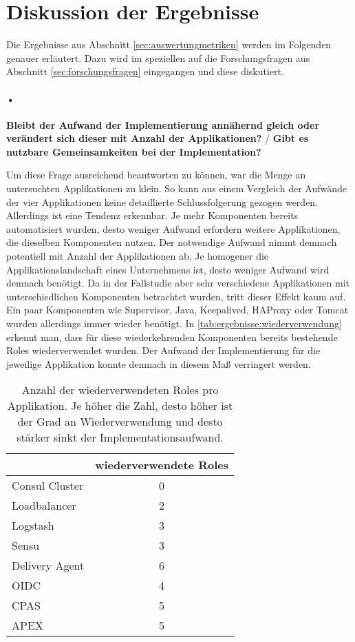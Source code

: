 \section{Diskussion der Ergebnisse}
\label{sec:diskussion}
Die Ergebnisse aus Abschnitt \ref{sec:auswertungmetriken} werden im Folgenden genauer erläutert. Dazu wird im speziellen auf die Forschungsfragen aus Abschnitt \ref{sec:forschungsfragen} eingegangen und diese diskutiert.

\paragraph{•}
\textbf{Bleibt der Aufwand der Implementierung annähernd gleich oder verändert sich dieser mit Anzahl der Applikationen?} / \textbf{Gibt es nutzbare Gemeinsamkeiten bei der Implementation?}

Um diese Frage ausreichend beantworten zu können, war die Menge an untersuchten Applikationen zu klein. So kann aus einem Vergleich der Aufwände der vier Applikationen keine detaillierte Schlussfolgerung gezogen werden. Allerdings ist eine Tendenz erkennbar. Je mehr Komponenten bereits automatisiert wurden, desto weniger Aufwand erfordern weitere Applikationen, die dieselben Komponenten nutzen. Der notwendige Aufwand nimmt demnach potentiell mit Anzahl der Applikationen ab. Je homogener die Applikationslandschaft eines Unternehmens ist, desto weniger Aufwand wird demnach benötigt. Da in der Fallstudie aber sehr verschiedene Applikationen mit unterschiedlichen Komponenten betrachtet wurden, tritt dieser Effekt kaum auf. Ein paar Komponenten wie Supervisor, Java, Keepalived, HAProxy oder Tomcat wurden allerdings immer wieder benötigt. In \autoref{tab:ergebnisse:wiederverwendung} erkennt man, dass für diese wiederkehrenden Komponenten bereits bestehende Roles wiederverwendet wurden. Der Aufwand der Implementierung für die jeweilige Applikation konnte demnach in diesem Maß verringert werden.

\begin{table}[ht]
\setlength{\tabcolsep}{5pt}
\renewcommand{\arraystretch}{1.5}
\centering
\begin{tabular}{|l|c|}
\hline
\rowcolor[HTML]{C0C0C0}
\multicolumn{1}{|c|}{\textbf{Applikation}} & \textbf{wiederverwendete Roles}\\ 
\hline
Consul Cluster		& 0 	\\ 
\hline
Loadbalancer			& 2 	\\ 
\hline						
Logstash				& 3 \\
\hline
Sensu				& 3 \\
\hline
Delivery Agent		& 6	\\
\hline
OIDC					& 4 \\
\hline
CPAS					& 5 \\
\hline
APEX					& 5 \\
\hline
\end{tabular} 
\caption[Anzahl der wiederverwendeten Roles pro Applikation]{Anzahl der wiederverwendeten Roles pro Applikation. Je höher die Zahl, desto höher ist der Grad an Wiederverwendung und desto stärker sinkt der Implementationsaufwand.}
\label{tab:ergebnisse:wiederverwendung}
\end{table}

